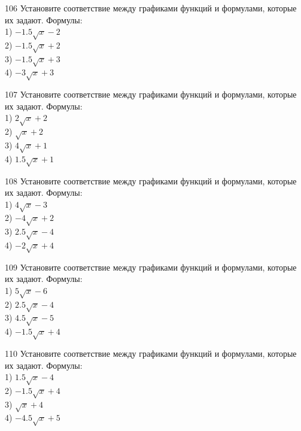 \documentclass[4apaper]{article}
\begin{document}
\begin{taskBN}{106}
Установите соответствие между графиками функций и формулами, которые их задают. Формулы: \\1) $-1.5\sqrt{x}-2$\\2) $-1.5\sqrt{x}+2$\\3) $-1.5\sqrt{x}+3$\\4) $-3\sqrt{x}+3$
\end{taskBN}

\begin{taskBN}{107}
Установите соответствие между графиками функций и формулами, которые их задают. Формулы: \\1) $2\sqrt{x}+2$\\2) $\sqrt{x}+2$\\3) $4\sqrt{x}+1$\\4) $1.5\sqrt{x}+1$
\end{taskBN}

\begin{taskBN}{108}
Установите соответствие между графиками функций и формулами, которые их задают. Формулы: \\1) $4\sqrt{x}-3$\\2) $-4\sqrt{x}+2$\\3) $2.5\sqrt{x}-4$\\4) $-2\sqrt{x}+4$
\end{taskBN}

\begin{taskBN}{109}
Установите соответствие между графиками функций и формулами, которые их задают. Формулы: \\1) $5\sqrt{x}-6$\\2) $2.5\sqrt{x}-4$\\3) $4.5\sqrt{x}-5$\\4) $-1.5\sqrt{x}+4$
\end{taskBN}

\begin{taskBN}{110}
Установите соответствие между графиками функций и формулами, которые их задают. Формулы: \\1) $1.5\sqrt{x}-4$\\2) $-1.5\sqrt{x}+4$\\3) $\sqrt{x}+4$\\4) $-4.5\sqrt{x}+5$
\end{taskBN}
\end{document}
